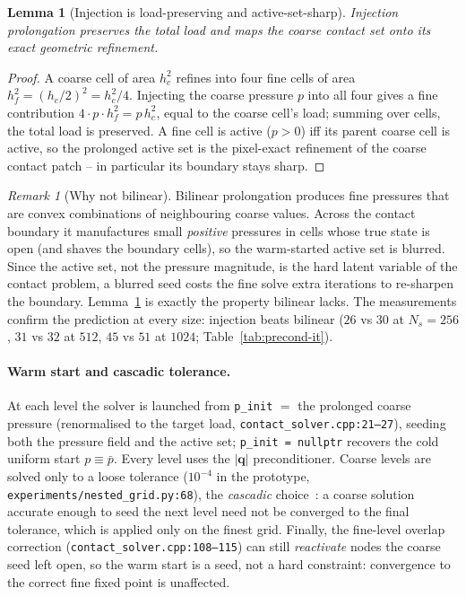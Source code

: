 \documentclass[11pt,a4paper]{article}
\newcommand{\abs}[1]{\left\lvert #1 \right\rvert}
\newcommand{\code}[1]{\texttt{#1}}
\newtheorem{lemma}{Lemma}
\theoremstyle{definition}
\theoremstyle{remark}
\newtheorem{remark}{Remark}
\begin{document}
\begin{lemma}[Injection is load-preserving and active-set-sharp]
\label{lem:inject}
Injection prolongation preserves the total load and maps the coarse contact set
onto its exact geometric refinement.
\end{lemma}
\begin{proof}
A coarse cell of area $h_c^2$ refines into four fine cells of area
$h_f^2=(h_c/2)^2=h_c^2/4$. Injecting the coarse pressure $p$ into all four gives a
fine contribution $4\cdot p\cdot h_f^2 = p\,h_c^2$, equal to the coarse cell's
load; summing over cells, the total load is preserved. A fine cell is active
($p>0$) iff its parent coarse cell is active, so the prolonged active set is the
pixel-exact refinement of the coarse contact patch -- in particular its boundary
stays sharp.
\end{proof}

\begin{remark}[Why not bilinear]
Bilinear prolongation produces fine pressures that are convex combinations of
neighbouring coarse values. Across the contact boundary it manufactures small
\emph{positive} pressures in cells whose true state is open (and shaves the
boundary cells), so the warm-started active set is blurred. Since the active set,
not the pressure magnitude, is the hard latent variable of the contact problem, a
blurred seed costs the fine solve extra iterations to re-sharpen the boundary.
Lemma~\ref{lem:inject} is exactly the property bilinear lacks. The measurements
confirm the prediction at every size: injection beats bilinear ($26$ vs $30$ at
$N_s=256$, $31$ vs $32$ at $512$, $45$ vs $51$ at $1024$;
Table~\ref{tab:precond-it}).
\end{remark}

\paragraph{Warm start and cascadic tolerance.}
At each level the solver is launched from \code{p\_init} $=$ the prolonged coarse
pressure (renormalised to the target load, \code{contact\_solver.cpp:21--27}),
seeding both the pressure field and the active set; \code{p\_init = nullptr}
recovers the cold uniform start $p\equiv\bar p$. Every level uses the
$\abs{\mathbf q}$ preconditioner. Coarse levels are solved only to a loose
tolerance ($10^{-4}$ in the prototype, \code{experiments/nested\_grid.py:68}), the
\emph{cascadic} choice~\cite{BornemannDeuflhard1996}: a coarse solution accurate
enough to seed the next level need not be converged to the final tolerance, which
is applied only on the finest grid. Finally, the fine-level overlap correction
(\code{contact\_solver.cpp:108--115}) can still \emph{reactivate} nodes the coarse
seed left open, so the warm start is a seed, not a hard constraint: convergence to
the correct fine fixed point is unaffected.
\end{document}
